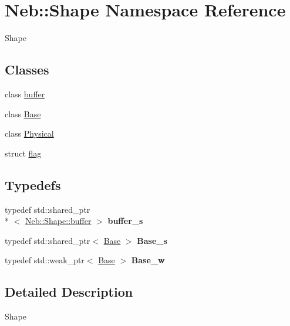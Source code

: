 \hypertarget{namespaceNeb_1_1Shape}{\section{Neb\-:\-:Shape Namespace Reference}
\label{namespaceNeb_1_1Shape}
}


Shape  


\subsection*{Classes}
\begin{DoxyCompactItemize}
\item 
class \hyperlink{classNeb_1_1Shape_1_1buffer}{buffer}
\item 
class \hyperlink{classNeb_1_1Shape_1_1Base}{Base}
\item 
class \hyperlink{classNeb_1_1Shape_1_1Physical}{Physical}
\item 
struct \hyperlink{structNeb_1_1Shape_1_1flag}{flag}
\end{DoxyCompactItemize}
\subsection*{Typedefs}
\begin{DoxyCompactItemize}
\item 
\hypertarget{namespaceNeb_1_1Shape_aa288e6a27ff7da8b5ab5bbe8a4d1a4fe}{typedef std\-::shared\-\_\-ptr\\*
$<$ \hyperlink{classNeb_1_1Shape_1_1buffer}{Neb\-::\-Shape\-::buffer} $>$ {\bfseries buffer\-\_\-s}}\label{namespaceNeb_1_1Shape_aa288e6a27ff7da8b5ab5bbe8a4d1a4fe}

\item 
\hypertarget{namespaceNeb_1_1Shape_a1c124de9873c83d85982ae0f7e7d042e}{typedef std\-::shared\-\_\-ptr$<$ \hyperlink{classNeb_1_1Shape_1_1Base}{Base} $>$ {\bfseries Base\-\_\-s}}\label{namespaceNeb_1_1Shape_a1c124de9873c83d85982ae0f7e7d042e}

\item 
\hypertarget{namespaceNeb_1_1Shape_ae81cd4f7d965cb2b232b5855f395c8da}{typedef std\-::weak\-\_\-ptr$<$ \hyperlink{classNeb_1_1Shape_1_1Base}{Base} $>$ {\bfseries Base\-\_\-w}}\label{namespaceNeb_1_1Shape_ae81cd4f7d965cb2b232b5855f395c8da}

\end{DoxyCompactItemize}


\subsection{Detailed Description}
Shape 